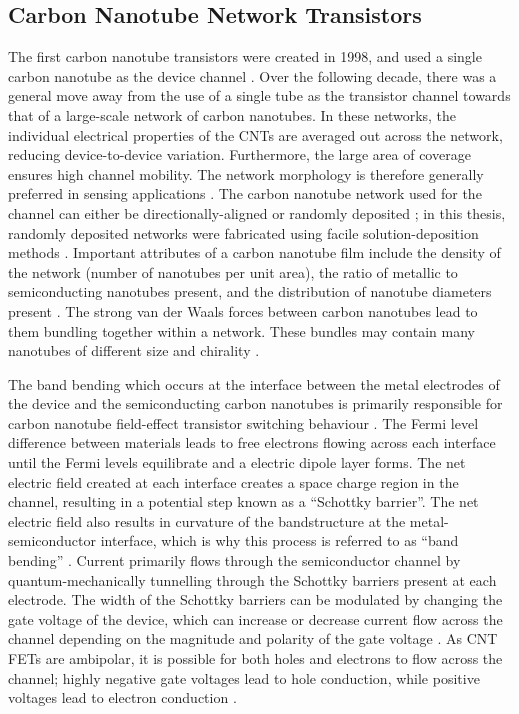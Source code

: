 \documentclass[
  a4paper,
]{scrbook}
\begin{document}
\hypertarget{sec-cnt-network-details}{%
\subsection{Carbon Nanotube Network
Transistors}\label{sec-cnt-network-details}}

The first carbon nanotube transistors were created in 1998, and used a
single carbon nanotube as the device channel
\autocite{Martel1998,Tans1998,Kauffman2008}. Over the following decade,
there was a general move away from the use of a single tube as the
transistor channel towards that of a large-scale network of carbon
nanotubes. In these networks, the individual electrical properties of
the CNTs are averaged out across the network, reducing device-to-device
variation. Furthermore, the large area of coverage ensures high channel
mobility. The network morphology is therefore generally preferred in
sensing applications \autocite{Hu2004,Cao2009,Murugathas2019,Li2023}.
The carbon nanotube network used for the channel can either be
directionally-aligned or randomly deposited
\autocite{Cao2009,Shkodra2021}; in this thesis, randomly deposited
networks were fabricated using facile solution-deposition methods
\autocite{Zheng2017,Cassie2023}. Important attributes of a carbon
nanotube film include the density of the network (number of nanotubes
per unit area), the ratio of metallic to semiconducting nanotubes
present, and the distribution of nanotube diameters present
\autocite{Cao2009,Shkodra2021}. The strong van der Waals forces between
carbon nanotubes lead to them bundling together within a network. These
bundles may contain many nanotubes of different size and chirality
\autocite{Fuhrer2000,Hu2004,Cao2009,Murugathas2019}.

The band bending which occurs at the interface between the metal
electrodes of the device and the semiconducting carbon nanotubes is
primarily responsible for carbon nanotube field-effect transistor
switching behaviour \autocite{Avouris2007,Bargaoui2018}. The Fermi level
difference between materials leads to free electrons flowing across each
interface until the Fermi levels equilibrate and a electric dipole layer
forms. The net electric field created at each interface creates a space
charge region in the channel, resulting in a potential step known as a
``Schottky barrier''. The net electric field also results in curvature
of the bandstructure at the metal-semiconductor interface, which is why
this process is referred to as ``band bending'' \autocite{Zhang2012}.
Current primarily flows through the semiconductor channel by
quantum-mechanically tunnelling through the Schottky barriers present at
each electrode. The width of the Schottky barriers can be modulated by
changing the gate voltage of the device, which can increase or decrease
current flow across the channel depending on the magnitude and polarity
of the gate voltage \autocite{Avouris2007,Bargaoui2018}. As CNT FETs are
ambipolar, it is possible for both holes and electrons to flow across
the channel; highly negative gate voltages lead to hole conduction,
while positive voltages lead to electron conduction
\autocite{Avouris2007}.
\end{document}
